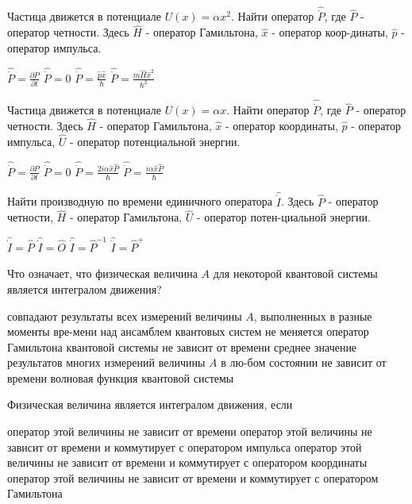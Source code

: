 \documentclass[11pt,a4paper]{exam}
\begin{document}
\begin{questions}
\question Частица движется в потенциале $U(x) = \alpha {x^2}$. Найти оператор $\hat \dot P$, где $\hat P$ - оператор четности. Здесь $\hat H$ - оператор Гамильтона, $\hat x$ - оператор коор-динаты, $\hat p$ - оператор импульса. 
\begin{choices}
\choice $\hat \dot P = \frac{{\partial \hat P}}{{\partial t}}$    
\choice $\hat \dot P = 0$     
\choice $\hat \dot P = \frac{{\hat p\hat x}}{\hbar }$    
\choice $\hat \dot P = \frac{{m\hat H{{\hat x}^2}}}{{{\hbar ^2}}}$
\end{choices}

\question Частица движется в потенциале $U(x) = \alpha x$. Найти оператор $\hat \dot P$, где $\hat P$ - оператор четности. Здесь $\hat H$ - оператор Гамильтона, $\hat x$ - оператор координаты, $\hat p$ - оператор импульса, $\hat U$ - оператор потенциальной энергии. 
\begin{choices}
\choice $\hat \dot P = \frac{{\partial \hat P}}{{\partial t}}$    
\choice $\hat \dot P = 0$     
\choice $\hat \dot P = \frac{{2i\alpha \hat x\hat P}}{\hbar }$    
\choice $\hat \dot P = \frac{{i\alpha \hat x\hat P}}{\hbar }$
\end{choices}


\question Найти производную по времени единичного оператора $\hat \dot I$.
Здесь $\hat P$ - оператор четности, $\hat H$ - оператор Гамильтона, $\hat U$ - оператор потен-циальной энергии. 
\begin{choices}
\choice $\hat \dot I = \hat P$      
\choice $\hat \dot I = \hat O$      
\choice $\hat \dot I = {\hat P^{ - 1}}$      
\choice $\hat \dot I = {\hat P^ + }$
\end{choices}

\question Что означает, что физическая величина $A$ для некоторой квантовой системы является интегралом движения? 
\begin{choices}
\choice совпадают результаты всех измерений величины $A$, выполненных в разные моменты вре-мени над ансамблем квантовых систем
\choice не меняется оператор Гамильтона квантовой системы
\choice не зависит от времени среднее значение результатов многих измерений величины $A$ в лю-бом состоянии
\choice не зависит от времени волновая функция квантовой системы
\end{choices}

\question Физическая величина является интегралом движения, если
\begin{choices}
\choice оператор этой величины не зависит от времени
\choice оператор этой величины не зависит от времени и коммутирует с оператором импульса
\choice оператор этой величины не зависит от времени и коммутирует с оператором координаты
\choice оператор этой величины не зависит от времени и коммутирует с оператором Гамильтона 
\end{choices}


\end{questions}
\end{document}
